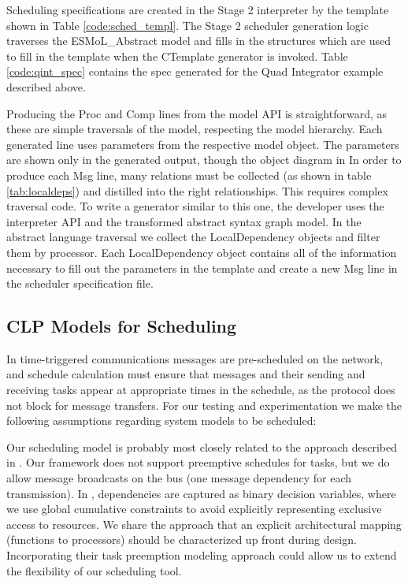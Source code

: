 Scheduling specifications are created in the Stage 2 interpreter by the template shown in 
Table \ref{code:sched_templ}.
The Stage 2 scheduler generation logic traverses the ESMoL\_Abstract model and fills in the structures
which are used to fill in the template when the CTemplate generator is invoked.  Table \ref{code:qint_spec}
contains the spec generated for the Quad Integrator example described above.

Producing the Proc and Comp lines from the model API is straightforward,
as these are simple traversals of the model, respecting the model hierarchy. 
Each generated line uses parameters from the respective model object. 
The parameters are shown only in the generated output, though the object diagram in 
In order to produce each Msg line, many relations must be collected (as shown 
in table \ref{tab:localdeps}) and distilled into the right relationships.  
This requires complex traversal code.  To write a generator similar to this one, the developer uses the 
interpreter API and the transformed abstract syntax graph model.  In the abstract language
traversal we collect the LocalDependency objects and filter them by processor. 
Each LocalDependency object contains all of the information necessary to fill
out the parameters in the template and create a new Msg line in the
scheduler specification file.

\subsection{CLP Models for Scheduling}


In time-triggered communications messages are pre-scheduled on the network, and schedule calculation must ensure that messages and their sending and receiving tasks appear at appropriate times in the schedule, as the protocol does not block for message transfers.  For our testing and experimentation we make the following assumptions regarding system models to be scheduled:

Our scheduling model is probably most closely related to the approach described in 
\cite{sched:zhengchong}.  Our framework does not support preemptive schedules for tasks, but we do allow 
message broadcasts on the bus (one message dependency for each transmission).  In \cite{sched:zhengchong}, 
dependencies are captured as binary decision variables, where we use global cumulative constraints to 
avoid explicitly representing exclusive access to resources.  We share the approach that an explicit 
architectural mapping (functions to processors) should be characterized up front during design. 
 Incorporating their task preemption modeling approach could allow us to extend the flexibility of our 
scheduling tool.


